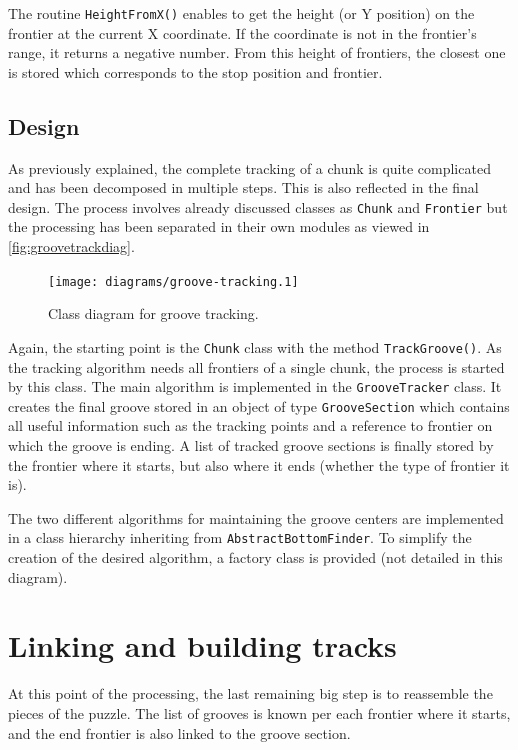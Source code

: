 The routine \texttt{HeightFromX()} enables to get the height (or Y position) on the frontier at the current X coordinate. If the coordinate is not in the frontier's range, it returns a negative number. From this height of frontiers, the closest one is stored which corresponds to the stop position and frontier.

\subsection{Design}

As previously explained, the complete tracking of a chunk is quite complicated and has been decomposed in multiple steps. This is also reflected in the final design. The process involves already discussed classes as \texttt{Chunk} and \texttt{Frontier} but the processing has been separated in their own modules as viewed in \autoref{fig:groovetrackdiag}.

\begin{figure}[!ht]
\centering
\texttt{[image: diagrams/groove-tracking.1]}
\caption{Class diagram for groove tracking.}
\label{fig:groovetrackdiag}
\end{figure}

Again, the starting point is the \texttt{Chunk} class with the method \texttt{TrackGroove()}. As the tracking algorithm needs all frontiers of a single chunk, the process is started by this class. The main algorithm is implemented in the \texttt{GrooveTracker} class. It creates the final groove stored in an object of type \texttt{GrooveSection} which contains all useful information such as the tracking points and a reference to frontier on which the groove is ending. A list of tracked groove sections is finally stored by the frontier where it starts, but also where it ends (whether the type of frontier it is).

The two different algorithms for maintaining the groove centers are implemented in a class hierarchy inheriting from \texttt{AbstractBottomFinder}. To simplify the creation of the desired algorithm, a factory class is provided (not detailed in this diagram).

\section{Linking and building tracks}

At this point of the processing, the last remaining big step is to reassemble the pieces of the puzzle. The list of grooves is known per each frontier where it starts, and the end frontier is also linked to the groove section.

